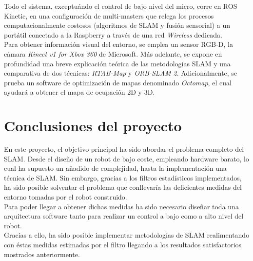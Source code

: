 \documentclass[a4paper,twoside]{article}
\begin{document}
Todo el sistema, exceptuándo el control de bajo nivel del micro, corre en ROS Kinetic, en una configuración de multi-masters que relega los procesos computacionalmente costosos
(algoritmos de SLAM y fusión sensorial) a un portátil conectado a la Raspberry a través de una red \textit{Wireless} dedicada.\\

Para obtener información visual del entorno, se emplea un sensor RGB-D, la cámara \textit{Kinect v1 for Xbox 360} de Microsoft.
Más adelante, se expone en profundidad una breve explicación teórica de las metodologías SLAM y una comparativa de dos técnicas: \textit{RTAB-Map} y \textit{ORB-SLAM 2}. Adicionalmente, se prueba un software de optimización de mapas denominado \textit{Octomap}, el cual ayudará a obtener el mapa de ocupación 2D y 3D.

\newpage


\newpage


\newpage


\newpage
\section{Conclusiones del proyecto}
En este proyecto, el objetivo principal ha sido abordar el problema completo del SLAM. Desde el diseño de un robot de bajo coste, empleando hardware barato, lo cual ha supuesto
un añadido de complejidad, hasta la implementación una técnica de SLAM. Sin embargo, gracias a los filtros estadísticos implementados, ha sido posible solventar el problema que conllevaría las deficientes medidas 
del entorno tomadas por el robot construido. \\
Para poder llegar a obtener dichas medidas ha sido necesario diseñar toda una arquitectura software tanto para realizar un control  a bajo como a alto nivel del robot. \\
Gracias a ello, ha sido posible implementar metodologías de SLAM realimentando con éstas medidas estimadas por el filtro llegando a los resultados satisfactorios mostrados anteriormente.


\nocite{murORB2}
\nocite{rtabmap}
\nocite{hornung13auro}
\nocite{MooreStouchKeneralizedEkf2014}
\nocite{PyCmdMessenger}
\nocite{CmdMessenger}
\nocite{WinNT}
\nocite{atmega}
\nocite{mpu6050_datasheet}
\nocite{mpu6050_regmap}
\nocite{intSLAM_I}
\nocite{intSLAM_II}
\end{document}

